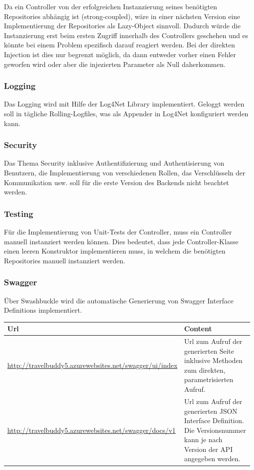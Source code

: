 \documentclass[a4paper,10pt,xetex]{article}
\begin{document}
Da ein Controller von der erfolgreichen Instanzierung seines ben\"otigten Repositories abh\"angig ist (strong-coupled),
w\"are in einer n\"achsten Version eine Implementierung der Repositories als Lazy-Object sinnvoll. Dadurch w\"urde die
Instanzierung erst beim ersten Zugriff innerhalb des Controllers geschehen und es k\"onnte bei einem Problem spezifisch
darauf reagiert werden. Bei der direkten Injection ist dies nur begrenzt m\"oglich, da dann entweder vorher einen Fehler
geworfen wird oder aber die injezierten Parameter als Null daherkommen.

\subsubsection{Logging}\label{logging}
Das Logging wird mit Hilfe der Log4Net Library implementiert. Geloggt werden soll in t\"agliche Rolling-Logfiles, was
als Appender in Log4Net konfiguriert werden kann.

\subsubsection{Security}\label{security}
Das Thema Security inklusive Authentifizierung und Authentisierung von Benutzern, die Implementierung von verschiedenen
Rollen, das Verschl\"usseln der Kommunikation usw. soll f\"ur die erste Version des Backends nicht beachtet werden.

\subsubsection{Testing}\label{testing}
F\"ur die Implementierung von Unit-Tests der Controller, muss ein Controller manuell instanziert werden k\"onnen. Dies
bedeutet, dass jede Controller-Klasse einen leeren Konstruktor implementieren muss, in welchem die ben\"otigten
Repositories manuell instanziert werden.

\subsubsection{Swagger}\label{swagger}
\"Uber Swashbuckle wird die automatische Generierung von Swagger Interface Definitions implementiert.

\begin{longtabu} to \textwidth { | X[l] | X[l] | }
\hline
\textbf{Url} & \textbf{Content} \\\hline
\endhead

\url{http://travelbuddy5.azurewebsites.net/swagger/ui/index} & Url zum Aufruf der
  generierten Seite inklusive Methoden zum direkten, parametrisierten Aufruf.\\\hline
\url{http://travelbuddy5.azurewebsites.net/swagger/docs/v1} & Url zum Aufruf der generierten
  JSON Interface Definition. Die Versionsnummer kann je nach Version der API angegeben werden.\\\hline
\end{longtabu}
\end{document}
